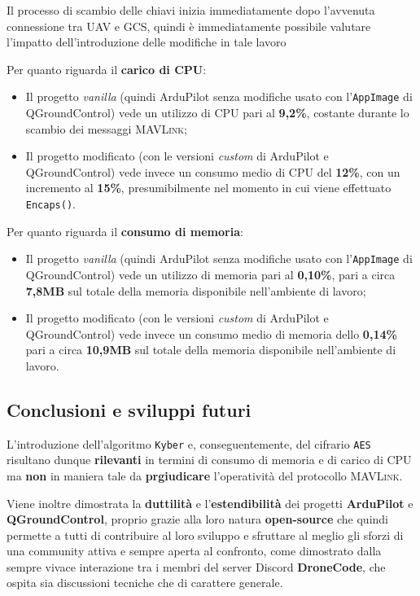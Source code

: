 \documentclass[a4paper, 12pt, oneside]{article}
\theoremstyle{definition}
\begin{document}
Il processo di scambio delle chiavi inizia immediatamente dopo l'avvenuta connessione tra UAV e GCS, quindi è immediatamente possibile valutare l'impatto dell'introduzione delle modifiche in tale lavoro

Per quanto riguarda il \textbf{carico di CPU}:

\begin{itemize}
    \item Il progetto \textit{vanilla} (quindi ArduPilot senza modifiche usato con l'\texttt{AppImage} di QGroundControl) vede un utilizzo di CPU pari al \textbf{9,2\%}, costante durante lo scambio dei messaggi \textsc{MAVLink};
    \item Il progetto modificato (con le versioni \textit{custom} di ArduPilot e QGroundControl) vede invece un consumo medio di CPU del \textbf{12\%}, con un incremento al \textbf{15\%}, presumibilmente nel momento in cui viene effettuato \texttt{Encaps()}.
\end{itemize}

Per quanto riguarda il \textbf{consumo di memoria}:

\begin{itemize}
    \item Il progetto \textit{vanilla} (quindi ArduPilot senza modifiche usato con l'\texttt{AppImage} di QGroundControl) vede un utilizzo di memoria pari al \textbf{0,10\%}, pari a circa \textbf{7,8MB} sul totale della memoria disponibile nell'ambiente di lavoro; 
    \item Il progetto modificato (con le versioni \textit{custom} di ArduPilot e QGroundControl) vede invece un consumo medio di memoria dello \textbf{0,14\%} pari a circa \textbf{10,9MB} sul totale della memoria disponibile nell'ambiente di lavoro.
\end{itemize}

\subsection{Conclusioni e sviluppi futuri}
L'introduzione dell'algoritmo \texttt{Kyber} e, conseguentemente, del cifrario \texttt{AES} risultano dunque \textbf{rilevanti} in termini di consumo di memoria e di carico di CPU ma \textbf{non} in maniera tale da \textbf{prgiudicare} l'operatività del protocollo \textsc{MAVLink}. 

Viene inoltre dimostrata la \textbf{duttilità} e l'\textbf{estendibilità} dei progetti \textbf{ArduPilot} e \textbf{QGroundControl}, proprio grazie alla loro natura \textbf{open-source} che quindi permette a tutti di contribuire al loro sviluppo e sfruttare al meglio gli sforzi di una community attiva e sempre aperta al confronto, come dimostrato dalla sempre vivace interazione tra i membri del server Discord \textbf{DroneCode}, che ospita sia discussioni tecniche che di carattere generale.
\end{document}
